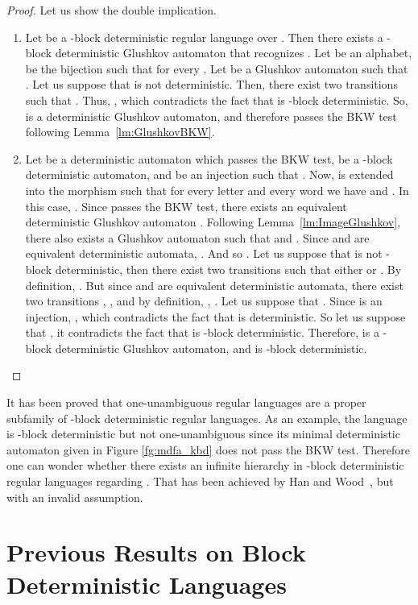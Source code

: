 \documentclass{llncs}
\begin{document}
\begin{proof}
  Let us show the double implication.
  \begin{enumerate}
	\item Let  be a -block deterministic regular language over .
	Then there exists a -block deterministic Glushkov automaton  that recognizes .
	Let  be an alphabet,  be
	the bijection such that for every . Let  be a Glushkov automaton such that .
	Let us suppose that  is not deterministic.
	Then, there exist two transitions  such that .
	Thus, , which contradicts the fact that  is -block deterministic.
	So,  is a deterministic Glushkov automaton, and therefore passes the BKW test following Lemma~\ref{lm:GlushkovBKW}.
	
	\item Let  be a deterministic automaton which passes the BKW test,  be a -block deterministic automaton, and  be an injection such that .
	Now,  is extended into the morphism  such that for every letter  and every word  we have  and .
	In this case, .
	Since  passes the BKW test, there exists an equivalent deterministic Glushkov automaton . Following Lemma~\ref{lm:ImageGlushkov}, there also exists a Glushkov automaton  such that  and .
	Since  and  are equivalent deterministic automata,
	.
	And so .
	Let us suppose that  is not -block deterministic, then there exist two transitions  such that either  or .
	By definition,  .
	But since  and  are equivalent deterministic automata, there exist two transitions , , and by definition, , .
	Let us suppose that .
	Since  is an injection, , which contradicts the fact that  is deterministic.
	So let us suppose that , it contradicts the fact that  is -block deterministic.
	Therefore,  is a -block deterministic Glushkov automaton, and  is -block deterministic.
\end{enumerate}
\end{proof}

	It has been proved that one-unambiguous regular languages are a proper subfamily of -block deterministic regular languages.
	As an example, the language  is -block deterministic but not one-unambiguous since its minimal deterministic automaton given in Figure \ref{fg:mdfa_kbd} does not pass the BKW test.
Therefore one can wonder whether there exists an infinite hierarchy in -block deterministic regular languages regarding .
That has been achieved by Han and Wood~\cite{HW08}, but with an invalid assumption.


\section{Previous Results on Block Deterministic Languages}\label{se:PrevRes}
\end{document}
